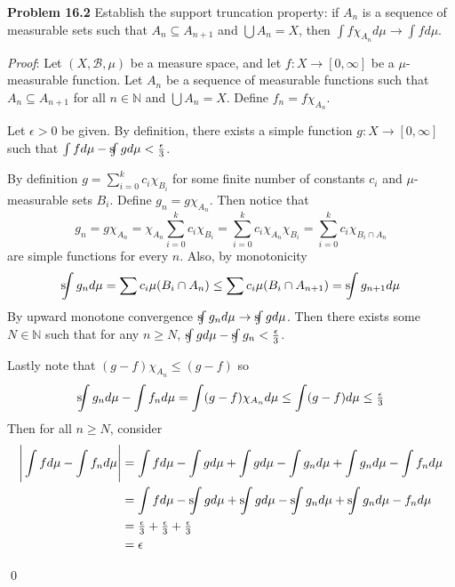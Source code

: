 \documentclass[12pt]{article}
\newcommand{\problem}[1]{\hspace{-4 ex} \large \textbf{Problem #1} }
\newcommand{\sint}{\text{s}\kern-5pt\int}
\renewenvironment{proof}{\hspace{-4 ex} \emph{Proof}:}{\qed}
\newcommand{\NN}{\mathbb{N}}
\newcommand{\BB}{\mathcal{B}}
\begin{document}
\bigbreak
\problem{16.2} Establish the support truncation property: if $A_n$ is a sequence of measurable sets such that $A_n\subseteq A_{n+1}$ and $\bigcup A_n=X$, then $\int f\chi_{A_n} d\mu\to\int f d\mu$.
\bigbreak

\begin{proof}
	Let $(X,\BB,\mu)$ be a measure space, and let $f:X \to [0,\infty]$ be a $\mu$-measurable function. Let $A_n$ be a sequence of measurable functions such that $A_n \subseteq A_{n+1}$ for all $n \in \NN$ and $\bigcup A_n = X$. Define $f_n = f\chi_{A_n}$. \bigbreak
	
	Let $\epsilon > 0$ be given. By definition, there exists a simple function $g:X \to [0,\infty]$ such that $\int f d\mu - \sint g d\mu < \tfrac{\epsilon}{3}$. \bigbreak
	
	By definition $g = \sum_{i=0}^k c_i \chi_{B_i}$ for some finite number of constants $c_i$ and $\mu$-measurable sets $B_i$. Define $g_n = g\chi_{A_n}$. Then notice that
	$$
	g_n = g\chi_{A_n} = \chi_{A_n} \sum_{i=0}^k c_i \chi_{B_i} =  \sum_{i=0}^k c_i \chi_{A_n} \chi_{B_i} = \sum_{i=0}^k c_i \chi_{B_i \cap A_n}
	$$
	are simple functions for every $n$. Also, by monotonicity
	$$
	\sint g_n d\mu = \sum c_i \mu(B_i \cap A_n) \leq \sum c_i \mu(B_i \cap A_{n+1}) = \sint g_{n+1} d\mu
	$$
	By upward monotone convergence $\sint g_n d\mu \to \sint g d\mu $. Then there exists some $N \in \NN$ such that for any $n \geq N$, $\sint g d\mu - \sint g_n < \tfrac{\epsilon}{3}$. \bigbreak
	
	Lastly note that $(g-f)\chi_{A_n} \leq (g-f)$ so 
	$$
	\sint g_n d\mu - \int f_n d\mu = \int(g-f)\chi_{A_n} d\mu \leq \int (g-f) d\mu \leq \tfrac{\epsilon}{3}
	$$
	Then for all $n \geq N$, consider
	\begin{align*}
		\Bigg \vert \int f d\mu - \int f_n d\mu \Bigg\vert 
		& = \int f d\mu - \int g d\mu + \int g d\mu - \int g_n d\mu + \int g_n d\mu - \int f_n d\mu \\
		& = \int f d\mu - \sint g d\mu + \sint g d\mu - \sint g_n d\mu + \sint g_n d\mu - f_n d\mu \\
		& = \tfrac{\epsilon}{3} + \tfrac{\epsilon}{3} + \tfrac{\epsilon}{3} \\
		& = \epsilon
	\end{align*}
	
\end{proof}
\end{document}

